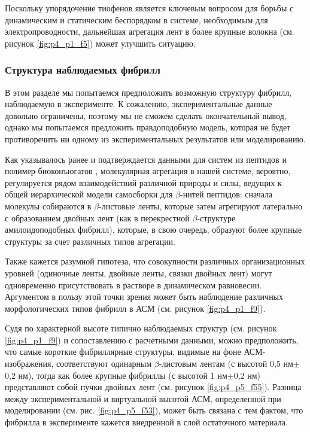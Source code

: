     Поскольку упорядочение тиофенов является ключевым вопросом для борьбы с динамическим и статическим беспорядком в системе, необходимым для электропроводности, дальнейшая агрегация лент в более крупные волокна (см. рисунок \ref{fig:p4_p1_f5}) может улучшить ситуацию.
    
\subsubsection{Структура наблюдаемых фибрилл}
    
    В этом разделе мы попытаемся предположить возможную структуру фибрилл, наблюдаемую в эксперименте. К сожалению, экспериментальные данные довольно ограничены, поэтому мы не сможем сделать окончательный вывод, однако мы попытаемся предложить правдоподобную модель, которая не будет противоречить ни одному из экспериментальных результатов или моделированию.

    Как указывалось ранее и подтверждается данными для систем из пептидов и полимер-биоконъюгатов \cite{borner_organization_2008,jahnke_molecular_2008}, молекулярная агрегация в нашей системе, вероятно, регулируется рядом взаимодействий различной природы и силы, ведущих к общей иерархической модели самосборки для $\beta$-нитей пептидов: сначала молекулы собираются в $\beta$-листовые ленты, которые затем агрегируют латерально с образованием двойных лент  (как в перекрестной $\beta$-структуре амилоидоподобных фибрилл), которые, в свою очередь, образуют более крупные структуры за счет различных типов агрегации.
    
    Также кажется разумной гипотеза, что совокупности различных организационных уровней (одиночные ленты, двойные ленты, связки двойных лент) могут одновременно присутствовать в растворе в динамическом равновесии. Аргументом в пользу этой точки зрения может быть наблюдение различных морфологических типов фибрилл в АСМ (см. рисунок \ref{fig:p4_p1_f9}).

    Судя по характерной высоте типично наблюдаемых структур (см. рисунок \ref{fig:p4_p1_f9}) и сопоставлению с расчетными данными, можно предположить, что самые короткие фибриллярные структуры, видимые на фоне АСМ-изображения, соответствуют одинарным $\beta$-листовым лентам (с высотой 0,5 нм$\pm$0,2 нм), тогда как более крупные фибриллы (с высотой 1 нм$\pm$0,2 нм) представляют собой пучки двойных лент (см. рисунок \ref{fig:p4_p5_f55}). Разница между экспериментальной и виртуальной высотой АСМ, определенной при моделировании (см. рис. \ref{fig:p4_p5_f53}), может быть связана с тем фактом, что фибрилла в эксперименте кажется внедренной в слой остаточного материала.
    
